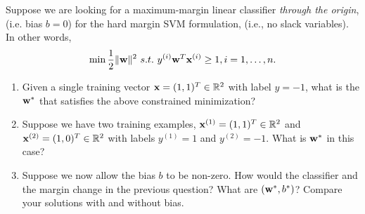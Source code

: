 \documentclass[11pt]{article}
\begin{document}

\vspace{-0.5in}

\newcommand{\bftheta}{\boldsymbol\theta}
\newcommand{\bfalpha}{\boldsymbol\alpha}



Suppose we are looking for a maximum-margin linear classifier \emph{through the origin}, (i.e. bias $b=0$) for the hard margin SVM formulation, (i.e., no slack variables). In other words, 
\begin{equation*}
    \min \frac{1}{2}\Vert{\mathbf w} \Vert^2\ s.t.\  y^{(i)} {\mathbf w}^T {\mathbf x}^{(i)} \geq 1, i = 1, \ldots, n.
\end{equation*}


\begin{enumerate}

\item {} Given a single training vector ${\mathbf x} = (1,1)^T \in \mathbb{R}^2$ with label $y = -1$, what is the ${\mathbf w}^\ast$ that satisfies the above constrained minimization?
\vspace{3cm}

\item {} Suppose we have two training examples, ${\mathbf x}^{(1)} = (1,1)^T \in \mathbb{R}^2$ and ${\mathbf x}^{(2)} = (1,0)^T \in \mathbb{R}^2$ with labels $y^{(1)} = 1$ and $y^{(2)} = -1$. What is ${\mathbf w}^\ast$ in this case?
\vspace{3cm}

\item {} Suppose we now allow the bias $b$ to be non-zero. How would the classifier and the margin change in the previous question? What are $({\mathbf w}^\ast, b^\ast)$? Compare your solutions with and without bias.
\vspace{6cm}

\end{enumerate}
\end{document}
